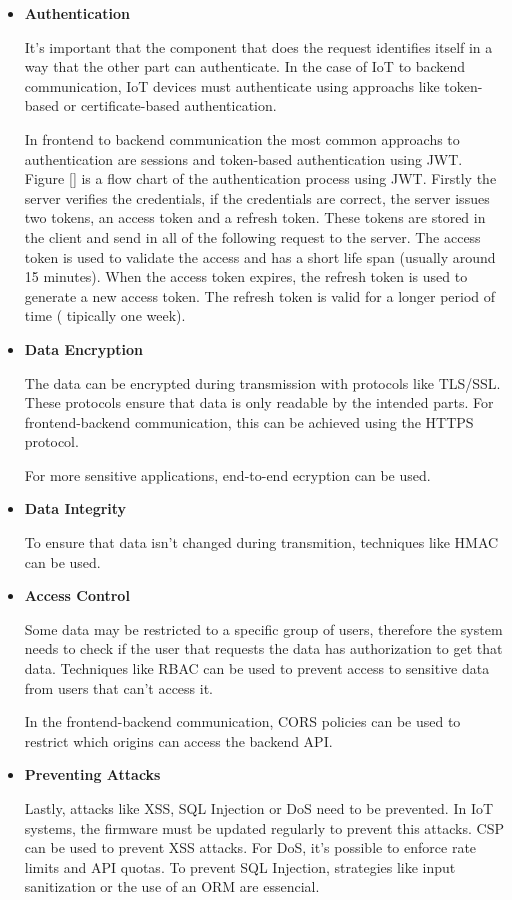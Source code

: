 \begin{itemize}

	\item \textbf{Authentication}

	      It's important that the component that does the request identifies itself
	      in a way that the other part can authenticate.
	      In the case of IoT to backend communication, IoT devices must authenticate
	      using approachs like token-based or certificate-based authentication.

	      In frontend to backend communication the most common approachs to
	      authentication are sessions and token-based authentication using JWT.
	      Figure \ref{} is a flow chart of the authentication process using JWT.
	      Firstly the server verifies the credentials, if the credentials are
	      correct, the server issues two tokens, an access token and a refresh
	      token. These tokens are stored in the client and send in all of the
	      following request to the server. The access token is used to validate
	      the access and has a short life span (usually around 15 minutes). When
	      the access token expires, the refresh token is used to generate a new
	      access token. The refresh token is valid for a longer period of time (
	      tipically one week).

	\item \textbf{Data Encryption}

	      The data can be encrypted during transmission with protocols like TLS/SSL.
	      These protocols ensure that data is only readable by the intended parts.
	      For frontend-backend communication, this can be achieved using the HTTPS
	      protocol.

	      For more sensitive applications, end-to-end ecryption can be used.

	\item \textbf{Data Integrity}

	      To ensure that data isn't changed during transmition, techniques like
	      HMAC can be used.

	\item \textbf{Access Control}

	      Some data may be restricted to a specific group of users, therefore the
	      system needs to check if the user that requests the data has
	      authorization to get that data. Techniques like RBAC can be used to
	      prevent access to sensitive data from users that can't access it.

	      In the frontend-backend communication, CORS policies can be used to
	      restrict which origins can access the backend API.

	\item \textbf{Preventing Attacks}

	      Lastly, attacks like XSS, SQL Injection or DoS need to be prevented.
	      In IoT systems, the firmware must be updated regularly to prevent this
	      attacks.
	      CSP can be used to prevent XSS attacks. For DoS, it's possible to enforce
	      rate limits and API quotas. To prevent SQL Injection, strategies like
	      input sanitization or the use of an ORM are essencial.
\end{itemize}

